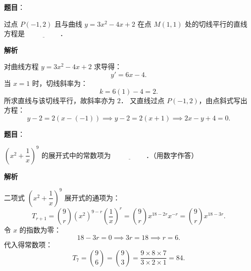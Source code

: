 \begin{answer}

\textbf{题目}：

过点 $P(-1, 2)$ 且与曲线 $y = 3x^2 - 4x + 2$ 在点 $M(1, 1)$ 处的切线平行的直线方程是 $\underline{\hspace{2cm}}$．

\textbf{解析}

对曲线方程 $y = 3x^2 - 4x + 2$ 求导得：
\nopagebreak[4]
\[
y' = 6x - 4.
\]
当 $x = 1$ 时，切线斜率为：
\nopagebreak[4]
\[
k = 6(1) - 4 = 2.
\]
所求直线与该切线平行，故斜率亦为 $2$．
又直线过点 $P(-1, 2)$，由点斜式写出方程：
\nopagebreak[4]
\[
y - 2 = 2(x - (-1)) \implies y - 2 = 2(x + 1) \implies 2x - y + 4 = 0.
\]


\end{answer}
\begin{answer}

\textbf{题目}：

$\left(x^2 + \dfrac{1}{x}\right)^9$ 的展开式中的常数项为 $\underline{\hspace{2cm}}$．（用数字作答）

\textbf{解析}

二项式 $\left(x^2 + \dfrac{1}{x}\right)^9$ 展开式的通项为：
\nopagebreak[4]
\[
T_{r+1} = \binom{9}{r} (x^2)^{9-r} \left(\frac{1}{x}\right)^r = \binom{9}{r} x^{18 - 2r} x^{-r} = \binom{9}{r} x^{18 - 3r}.
\]
令 $x$ 的指数为零：
\nopagebreak[4]
\[
18 - 3r = 0 \implies 3r = 18 \implies r = 6.
\]
代入得常数项：
\nopagebreak[4]
\[
T_7 = \binom{9}{6} = \binom{9}{3} = \frac{9 \times 8 \times 7}{3 \times 2 \times 1} = 84.
\]


\end{answer}
